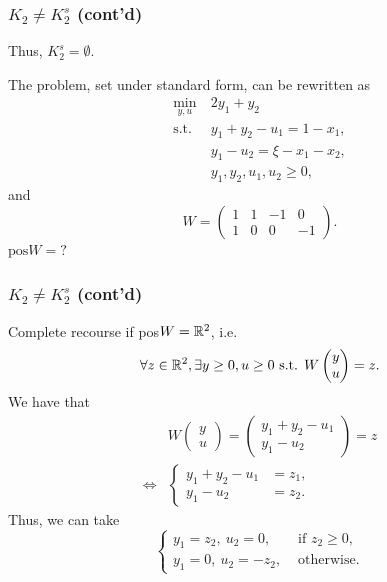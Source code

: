 \documentclass{beamer}
\begin{document}
\begin{frame}
\frametitle{$K_2 \ne K_2^s$ (cont'd)}

Thus, $K_2^s = \emptyset$.

\mbox{}

The problem, set under standard form, can be rewritten as
\begin{align*}
	\min_{y,u}\ & 2y_1+y_2\\
	\mbox{s.t. } & y_1 + y_2 - u_1 = 1 - x_1,\\
	& y_1 -u_2 = \xi - x_1 - x_2,\\
	& y_1, y_2, u_1, u_2 \geq 0,
\end{align*}
and
$$
W = \begin{pmatrix}
 1 & 1 & -1 & 0 \\ 1 & 0 & 0 & -1
\end{pmatrix}.
$$
$\text{pos} W = ?$

\end{frame}

\begin{frame}
\frametitle{$K_2 \ne K_2^s$ (cont'd)}

Complete recourse if pos$W = {\mathbb{R}}^2$, i.e.
$$
\forall z \in {\mathbb{R}}^2, \exists y \geq 0, u \geq 0 \text{ s.t. } W\begin{pmatrix} y \\ u \end{pmatrix} = z.
$$
We have that
\begin{align*}
& W\begin{pmatrix} y \\ u \end{pmatrix} = \begin{pmatrix} y_1 + y_2 - u_1 \\ y_1 - u_2 \end{pmatrix} = z \\
\Leftrightarrow &
\begin{cases}
	y_1 + y_2 - u_1 &= z_1, \\ y_1 - u_2 &= z_2.
\end{cases}
\end{align*}
Thus, we can take
$$
\begin{cases}
 y_1 = z_2,\ u_2 = 0, & \text{ if } z_2 \geq 0,\\
 y_1 = 0,\ u_2 = -z_2, & \text{ otherwise}.
\end{cases}
$$

\end{frame}
\end{document}
